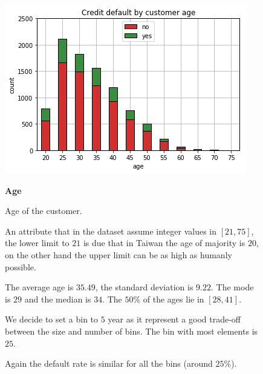 \smallskip
\begin{figure}[h]
  \begin{minipage}[h]{.45\textwidth}
    \includegraphics[width=.95\textwidth]{img/ch2/age}
  \end{minipage}
  \begin{minipage}[h]{.50\textwidth}
        {\Large \textbf{Age}}
        
        Age of the customer.
        
        An attribute that in the dataset assume integer values in $[21, 75]$, the lower limit to $21$ is due that in Taiwan the age of majority is $20$, on the other hand the upper limit can be as high as humanly possible.
        
        The average age is $35.49$, the standard deviation is $9.22$.
        The mode is $29$ and the median is $34$.
        The $50\%$ of the ages lie in $[28, 41]$.
        
        We decide to set a bin to $5$ year as it represent a good trade-off between the size and number of bins. The bin with most elements is $25$.
        
        Again the default rate is similar for all the bins (around $25\%$).
  \end{minipage}
\end{figure}

\smallskip

